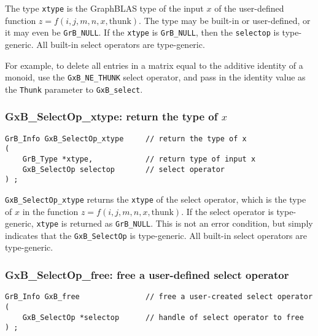\documentclass[12pt]{article}
\begin{document}
The type \verb'xtype' is the GraphBLAS type of the input $x$ of the
user-defined function $z=f(i,j,m,n,x,\mbox{thunk})$.  The type may be built-in
or user-defined, or it may even be \verb'GrB_NULL'.  If the \verb'xtype' is
\verb'GrB_NULL', then the \verb'selectop' is type-generic.
All built-in select operators are type-generic.

For example, to delete all entries in a matrix equal to the additive identity
of a monoid, use the \verb'GxB_NE_THUNK' select operator, and pass in
the identity value as the \verb'Thunk' parameter to \verb'GxB_select'.

\newpage
\subsubsection{{\sf GxB\_SelectOp\_xtype:} return the type of $x$}
\label{selectop_xtype}

\begin{mdframed}[userdefinedwidth=6in]
{\footnotesize
\begin{verbatim}
GrB_Info GxB_SelectOp_xtype     // return the type of x
(
    GrB_Type *xtype,            // return type of input x
    GxB_SelectOp selectop       // select operator
) ;

\end{verbatim}
}\end{mdframed}

\verb'GxB_SelectOp_xtype' returns the \verb'xtype' of the select operator,
which is the type of $x$ in the function $z=f(i,j,m,n,x,\mbox{thunk})$.  If the
select operator is type-generic, \verb'xtype' is returned as \verb'GrB_NULL'.
This is not an error condition, but simply indicates that the
\verb'GxB_SelectOp' is type-generic.  All built-in select operators
are type-generic.

\subsubsection{{\sf GxB\_SelectOp\_free:} free a user-defined select operator}
\label{selectop_free}

\begin{mdframed}[userdefinedwidth=6in]
{\footnotesize
\begin{verbatim}
GrB_Info GxB_free               // free a user-created select operator
(
    GxB_SelectOp *selectop      // handle of select operator to free
) ;
\end{verbatim}
}\end{mdframed}
\end{document}
